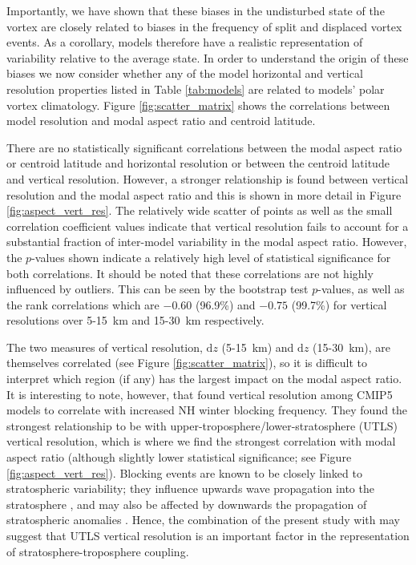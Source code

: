 Importantly, we have shown that these biases in the undisturbed state of the
vortex are closely related to biases in the frequency of split and displaced
vortex events. As a corollary, models therefore have a realistic representation
of variability relative to the average state. In order to understand the origin
of these biases we now consider whether any of the model horizontal and vertical
resolution properties listed in Table \ref{tab:models} are related to models'
polar vortex climatology. Figure \ref{fig:scatter_matrix} shows the correlations
between model resolution and modal aspect ratio and centroid latitude.

There are no statistically significant correlations between the modal aspect
ratio or centroid latitude and horizontal resolution or between the centroid
latitude and vertical resolution. However, a stronger relationship is found
between vertical resolution and the modal aspect ratio and this is shown in more
detail in Figure \ref{fig:aspect_vert_res}. The relatively wide scatter of
points as well as the small correlation coefficient values indicate that
vertical resolution fails to account for a substantial fraction of inter-model
variability in the modal aspect ratio. However, the $p$-values shown indicate a
relatively high level of statistical significance for both correlations. It
should be noted that these correlations are not highly influenced by
outliers. This can be seen by the bootstrap test $p$-values, as well as the rank
correlations which are $-0.60$ (96.9\%) and $-0.75$ (99.7\%) for vertical
resolutions over 5-15~km and 15-30~km respectively.

The two measures of vertical resolution, $\mathrm{d}z$ (5-15~km) and
$\mathrm{d}z$ (15-30~km), are themselves correlated (see Figure
\ref{fig:scatter_matrix}), so it is difficult to interpret which region (if any)
has the largest impact on the modal aspect ratio. It is interesting to note,
however, that \citet{Anstey2013} found vertical resolution among CMIP5 models to
correlate with increased NH winter blocking frequency. They found the strongest
relationship to be with upper-troposphere/lower-stratosphere (UTLS) vertical
resolution, which is where we find the strongest correlation with modal aspect
ratio (although slightly lower statistical significance; see Figure
\ref{fig:aspect_vert_res}). Blocking events are known to be closely linked to
stratospheric variability; they influence upwards wave propagation into the
stratosphere \citep{Polvani2004,Woollings2010c}, and may also be affected by
downwards the propagation of stratospheric anomalies
\citep{Tomassini2012,Mitchell2013,Vial2013}. Hence, the combination of the
present study with \citet{Anstey2013} may suggest that UTLS vertical resolution
is an important factor in the representation of stratosphere-troposphere
coupling.


